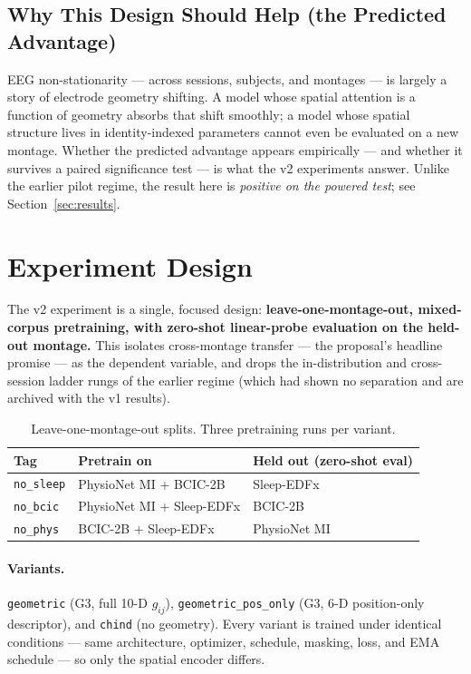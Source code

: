 \documentclass[11pt]{article}
\begin{document}
\subsection{Why This Design Should Help (the Predicted Advantage)}
\label{sec:solution:why}

EEG non-stationarity --- across sessions, subjects, and montages --- is
largely a story of electrode geometry shifting. A model whose spatial
attention is a function of geometry absorbs that shift smoothly; a model
whose spatial structure lives in identity-indexed parameters cannot even be
evaluated on a new montage. Whether the predicted advantage appears
empirically --- and whether it survives a paired significance test --- is
what the v2 experiments answer. Unlike the earlier pilot regime, the result
here is \emph{positive on the powered test}; see
Section~\ref{sec:results}.

\section{Experiment Design}
\label{sec:experiments}

The v2 experiment is a single, focused design: \textbf{leave-one-montage-out,
mixed-corpus pretraining, with zero-shot linear-probe evaluation on the
held-out montage.} This isolates cross-montage transfer --- the proposal's
headline promise --- as the dependent variable, and drops the in-distribution
and cross-session ladder rungs of the earlier regime (which had shown no
separation and are archived with the v1 results).

\begin{table}[h]
\centering
\caption{Leave-one-montage-out splits. Three pretraining runs per variant.}
\label{tab:splits}
\small
\begin{tabular}{lll}
\toprule
\textbf{Tag} & \textbf{Pretrain on} & \textbf{Held out (zero-shot eval)} \\
\midrule
\texttt{no\_sleep} & PhysioNet MI + BCIC-2B    & Sleep-EDFx \\
\texttt{no\_bcic}  & PhysioNet MI + Sleep-EDFx & BCIC-2B \\
\texttt{no\_phys}  & BCIC-2B + Sleep-EDFx      & PhysioNet MI \\
\bottomrule
\end{tabular}
\end{table}

\paragraph{Variants.}
\texttt{geometric} (G3, full 10-D $g_{ij}$), \texttt{geometric\_pos\_only}
(G3, 6-D position-only descriptor), and \texttt{chind} (no geometry). Every
variant is trained under identical conditions --- same architecture,
optimizer, schedule, masking, loss, and EMA schedule --- so only the spatial
encoder differs.
\end{document}
